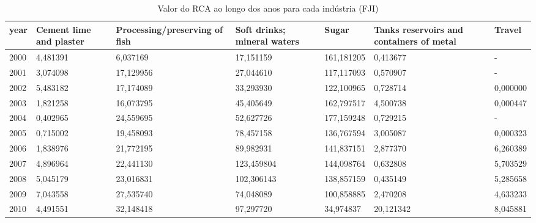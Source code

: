 \begin{table}
\centering
\caption{Valor do RCA ao longo dos anos para cada indústria (FJI)}
\begin{tabular}{p{1cm}p{2cm}p{2cm}p{2cm}p{2cm}p{2cm}p{2cm}}
\toprule
 year &  Cement lime and plaster &  Processing/preserving of fish &  Soft drinks; mineral waters &      Sugar &  Tanks reservoirs and containers of metal &    Travel \\
\midrule
 2000 &                 4,481391 &                       6,037169 &                    17,151159 & 161,181205 &                                  0,413677 &         - \\
 2001 &                 3,074098 &                      17,129956 &                    27,044610 & 117,117093 &                                  0,570907 &         - \\
 2002 &                 5,483182 &                      17,174089 &                    33,293930 & 122,100965 &                                  0,728714 &  0,000000 \\
 2003 &                 1,821258 &                      16,073795 &                    45,405649 & 162,797517 &                                  4,500738 &  0,000447 \\
 2004 &                 0,402965 &                      24,559695 &                    52,627726 & 177,159248 &                                  0,729215 &         - \\
 2005 &                 0,715002 &                      19,458093 &                    78,457158 & 136,767594 &                                  3,005087 &  0,000323 \\
 2006 &                 1,838976 &                      21,772195 &                    89,982931 & 141,837151 &                                  2,877370 &  6,260389 \\
 2007 &                 4,896964 &                      22,441130 &                   123,459804 & 144,098764 &                                  0,632808 &  5,703529 \\
 2008 &                 5,045179 &                      23,016831 &                   102,306143 & 138,857159 &                                  0,435149 &  5,285658 \\
 2009 &                 7,043558 &                      27,535740 &                    74,048089 & 100,858885 &                                  2,470208 &  4,633233 \\
 2010 &                 4,491551 &                      32,148418 &                    97,297720 &  34,974837 &                                 20,121342 &  8,045881 \\

\end{tabular}
\end{table}
